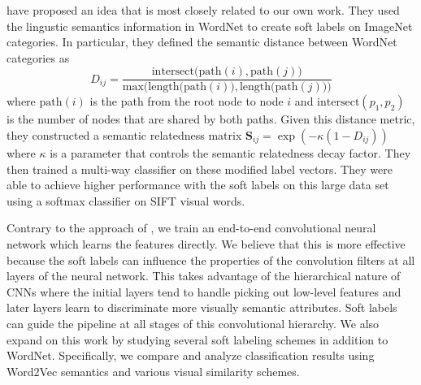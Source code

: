 \cite{zhao2011large} have proposed an idea that is most closely related to our
own work.
They used the lingustic semantics information in WordNet to create soft labels
on ImageNet categories. In particular, they defined the semantic distance
between WordNet categories as
$$D_{ij} = \frac{\mathrm{intersect(path}(i), \mathrm{path}(j))}{\mathrm{max(length(path}(i)), \mathrm{length(path}(j)))}$$
where $\mathrm{path}(i)$ is the path from the root node to node $i$ and
$\mathrm{intersect}(p_1, p_2)$ is the number of nodes that are shared by both
paths. Given this distance metric, they constructed a semantic relatedness
matrix $\mathbf{S}_{ij} = \exp(-\kappa(1-D_{ij}))$ where $\kappa$ is a
parameter that controls the semantic relatedness decay factor.
They then trained a multi-way classifier on these modified label vectors. They
were able to achieve higher performance with the soft labels on this large data
set using a softmax classifier on SIFT visual words.


Contrary to the approach of \cite{zhao2011large}, we train an end-to-end
convolutional neural network which learns the features directly.
We believe that this is more effective because the soft labels can influence
the properties of the convolution filters at all layers of the neural network.
This takes advantage of the hierarchical nature of CNNs where the initial
layers tend to handle picking out low-level features and later layers learn to
discriminate more visually semantic attributes. Soft labels can guide the
pipeline at all stages of this convolutional hierarchy.
We also expand on this work by studying several soft labeling schemes in
addition to WordNet. Specifically, we compare and analyze classification
results using Word2Vec semantics and various visual similarity schemes.
